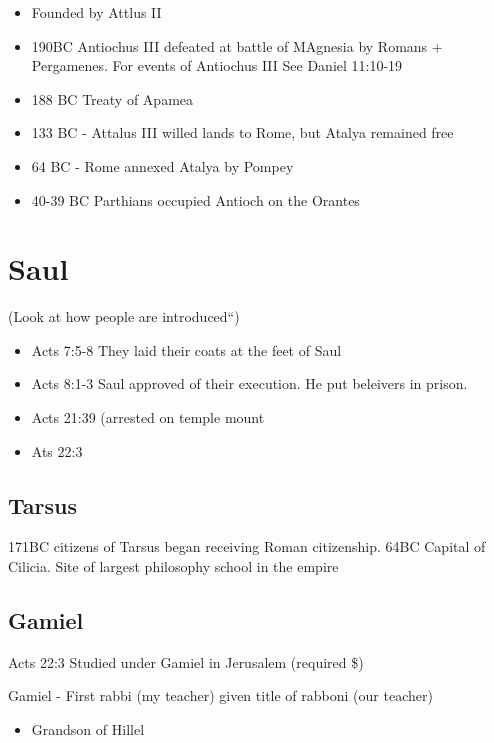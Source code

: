 \documentclass[
]{book}
\providecommand{\tightlist}{%
  \setlength{\itemsep}{0pt}\setlength{\parskip}{0pt}}
\begin{document}
\begin{itemize}
\tightlist
\item
  Founded by Attlus II
\item
  190BC Antiochus III defeated at battle of MAgnesia by Romans + Pergamenes.
  For events of Antiochus III See Daniel 11:10-19
\item
  188 BC Treaty of Apamea
\item
  133 BC - Attalus III willed lands to Rome, but Atalya remained free
\item
  64 BC - Rome annexed Atalya by Pompey
\item
  40-39 BC Parthians occupied Antioch on the Orantes
\end{itemize}

\hypertarget{saul}{%
\section{Saul}\label{saul}}

(Look at how people are introduced``)

\begin{itemize}
\tightlist
\item
  Acts 7:5-8 They laid their coats at the feet of Saul
\item
  Acts 8:1-3 Saul approved of their execution. He put beleivers in prison.
\item
  Acts 21:39 (arrested on temple mount
\item
  Ats 22:3
\end{itemize}

\hypertarget{tarsus}{%
\subsection{Tarsus}\label{tarsus}}

171BC citizens of Tarsus began receiving Roman citizenship. 64BC Capital of Cilicia. Site of largest philosophy school in the empire

\hypertarget{gamiel}{%
\subsection{Gamiel}\label{gamiel}}

Acts 22:3 Studied under Gamiel in Jerusalem (required \$)

Gamiel - First rabbi (my teacher) given title of rabboni (our teacher)

\begin{itemize}
\tightlist
\item
  Grandson of Hillel
\end{itemize}
\end{document}
